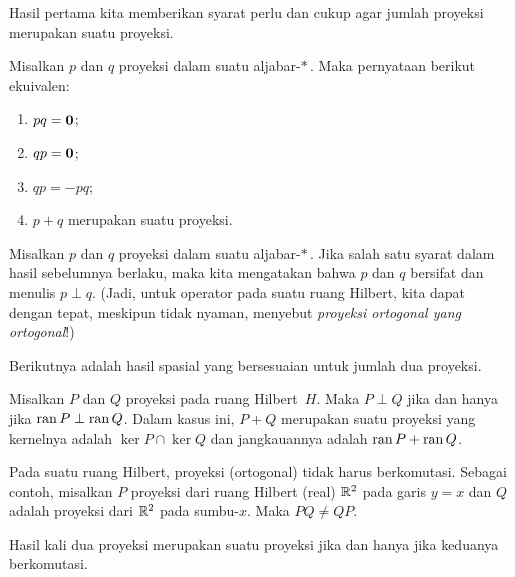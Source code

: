 Hasil pertama kita memberikan syarat perlu dan cukup agar jumlah proyeksi merupakan suatu proyeksi.

\begin{prop}\label{prop_sum_projs} Misalkan $p$ dan $q$ proyeksi dalam suatu aljabar-$*\,$. Maka pernyataan berikut ekuivalen:
 \begin{enumerate}[label=\rm{(\alph*)}]
  \item $pq = \mathbf{0}$;
  \item $qp = \mathbf{0}$;
  \item $qp = -pq$;
  \item $p + q$ merupakan suatu proyeksi.
 \end{enumerate}
\end{prop}

\begin{defn}\label{def_perp_projs} Misalkan $p$ dan $q$ proyeksi dalam suatu aljabar-$*\,$.  Jika salah satu syarat
dalam hasil sebelumnya berlaku, maka kita mengatakan bahwa $p$ dan $q$ bersifat
 dan menulis
$p \perp q$.  (Jadi, untuk operator pada suatu ruang Hilbert, kita dapat dengan tepat, meskipun tidak nyaman, menyebut
\emph{proyeksi ortogonal yang ortogonal}!)
\end{defn}

Berikutnya adalah hasil spasial yang bersesuaian untuk jumlah dua proyeksi.

\begin{prop} Misalkan $P$ dan $Q$ proyeksi pada ruang Hilbert~$H$. Maka $P \perp Q$
jika dan hanya jika $\operatorname{ran} P \perp \operatorname{ran} Q$. Dalam kasus ini, $P + Q$ merupakan suatu proyeksi
yang kernelnya adalah $\ker P \cap \ker Q$ dan jangkauannya adalah $\operatorname{ran} P + \operatorname{ran} Q$.
\end{prop}

\begin{exam} Pada suatu ruang Hilbert, proyeksi (ortogonal) tidak harus berkomutasi. Sebagai contoh,
misalkan $P$ proyeksi dari ruang Hilbert (real) $\mathbb{R}^2$ pada garis $y = x$ dan $Q$
adalah proyeksi dari $\mathbb{R}^2$ pada sumbu-$x$. Maka $PQ \ne QP$.
\end{exam}

Hasil kali dua proyeksi merupakan suatu proyeksi jika dan hanya jika keduanya berkomutasi.

